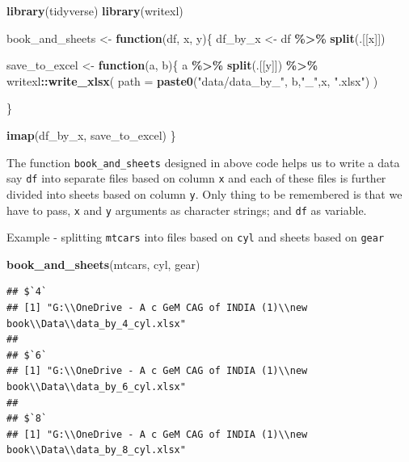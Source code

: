 \documentclass[
]{book}
\newenvironment{Shaded}{\begin{snugshade}}{\end{snugshade}}
\newcommand{\AttributeTok}[1]{\textcolor[rgb]{0.13,0.29,0.53}{#1}}
\newcommand{\ControlFlowTok}[1]{\textcolor[rgb]{0.13,0.29,0.53}{\textbf{#1}}}
\newcommand{\FunctionTok}[1]{\textcolor[rgb]{0.13,0.29,0.53}{\textbf{#1}}}
\newcommand{\NormalTok}[1]{#1}
\newcommand{\OtherTok}[1]{\textcolor[rgb]{0.56,0.35,0.01}{#1}}
\newcommand{\SpecialCharTok}[1]{\textcolor[rgb]{0.81,0.36,0.00}{\textbf{#1}}}
\newcommand{\StringTok}[1]{\textcolor[rgb]{0.31,0.60,0.02}{#1}}
\begin{document}
\begin{Shaded}
\begin{Highlighting}[]
\FunctionTok{library}\NormalTok{(tidyverse)}
\FunctionTok{library}\NormalTok{(writexl)}

\NormalTok{book\_and\_sheets }\OtherTok{\textless{}{-}} \ControlFlowTok{function}\NormalTok{(df, x, y)\{}
\NormalTok{  df\_by\_x }\OtherTok{\textless{}{-}}\NormalTok{ df }\SpecialCharTok{\%\textgreater{}\%} 
    \FunctionTok{split}\NormalTok{(.[[x]])}
  
\NormalTok{  save\_to\_excel }\OtherTok{\textless{}{-}} \ControlFlowTok{function}\NormalTok{(a, b)\{}
\NormalTok{    a }\SpecialCharTok{\%\textgreater{}\%} 
      \FunctionTok{split}\NormalTok{(.[[y]]) }\SpecialCharTok{\%\textgreater{}\%} 
\NormalTok{      writexl}\SpecialCharTok{::}\FunctionTok{write\_xlsx}\NormalTok{(}
        \AttributeTok{path =} \FunctionTok{paste0}\NormalTok{(}\StringTok{"data/data\_by\_"}\NormalTok{, b,}\StringTok{"\_"}\NormalTok{,x, }\StringTok{".xlsx"}\NormalTok{)}
\NormalTok{      )}
    
\NormalTok{  \}}
  
  \FunctionTok{imap}\NormalTok{(df\_by\_x, save\_to\_excel)}
\NormalTok{\}}
\end{Highlighting}
\end{Shaded}

The function \texttt{book\_and\_sheets} designed in above code helps us to write a data say \texttt{df} into separate files based on column \texttt{x} and each of these files is further divided into sheets based on column \texttt{y}. Only thing to be remembered is that we have to pass, \texttt{x} and \texttt{y} arguments as character strings; and \texttt{df} as variable.

Example - splitting \texttt{mtcars} into files based on \texttt{cyl} and sheets based on \texttt{gear}

\begin{Shaded}
\begin{Highlighting}[]
\FunctionTok{book\_and\_sheets}\NormalTok{(mtcars, }\StringTok{\textquotesingle{}cyl\textquotesingle{}}\NormalTok{, }\StringTok{\textquotesingle{}gear\textquotesingle{}}\NormalTok{)}
\end{Highlighting}
\end{Shaded}

\begin{verbatim}
## $`4`
## [1] "G:\\OneDrive - A c GeM CAG of INDIA (1)\\new book\\Data\\data_by_4_cyl.xlsx"
## 
## $`6`
## [1] "G:\\OneDrive - A c GeM CAG of INDIA (1)\\new book\\Data\\data_by_6_cyl.xlsx"
## 
## $`8`
## [1] "G:\\OneDrive - A c GeM CAG of INDIA (1)\\new book\\Data\\data_by_8_cyl.xlsx"
\end{verbatim}
\end{document}
